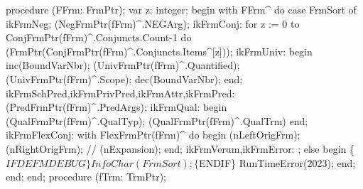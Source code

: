 procedure (FFrm: FrmPtr);
var
   z: integer;
begin
   with FFrm^ do
      case FrmSort of
         ikFrmNeg: (NegFrmPtr(fFrm)^.NEGArg);
         ikFrmConj:
            for z := 0 to ConjFrmPtr(fFrm)^.Conjuncts.Count-1 do
               (FrmPtr(ConjFrmPtr(fFrm)^.Conjuncts.Items^[z]));
         ikFrmUniv:
            begin
               inc(BoundVarNbr);
               (UnivFrmPtr(fFrm)^.Quantified);
               (UnivFrmPtr(fFrm)^.Scope);
               dec(BoundVarNbr);
            end;
         ikFrmSchPred,ikFrmPrivPred,ikFrmAttr,ikFrmPred:
            (PredFrmPtr(fFrm)^.PredArgs);
         ikFrmQual:
            begin
               (QualFrmPtr(fFrm)^.QualTyp);
               (QualFrmPtr(fFrm)^.QualTrm)
            end;
         ikFrmFlexConj:
            with FlexFrmPtr(fFrm)^ do
         begin
            (nLeftOrigFrm);
            (nRightOrigFrm);
            //       (nExpansion);
         end;
         ikFrmVerum,ikFrmError: ;
      else
      begin
         \{$IFDEF MDEBUG\}
         InfoChar(FrmSort);
         \{$ENDIF\}
         RunTimeError(2023);
      end;
      end;
end;
\eatline
{}\nwendcode{}\nwdocspar
\nwenddocs{}\endmoddef\nwstartdeflinemarkup{}\nwenddeflinemarkup
procedure (fTrm: TrmPtr);
